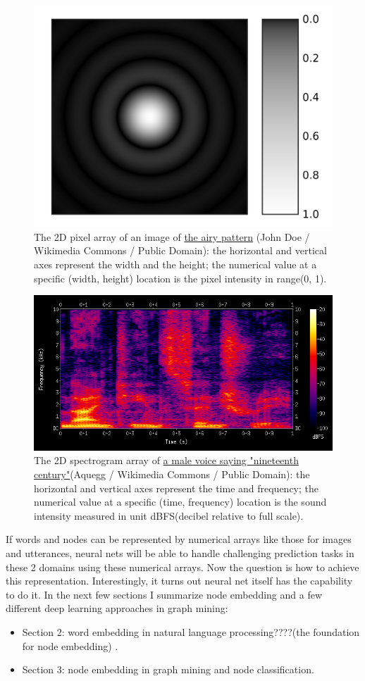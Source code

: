 \documentclass{article}
\begin{document}
\begin{figure}[h]
	\centering
	\includegraphics[width=0.5\linewidth]{Airy-pattern}
	\caption{The 2D pixel array of an image of  \href{https://commons.wikimedia.org/wiki/File:Airy-pattern.svg}{the airy pattern} (John Doe / Wikimedia Commons / Public Domain): the horizontal and vertical axes represent the width and the height; the numerical value at a specific (width, height) location is the pixel intensity in range(0, 1).}
	\label{fig:Airy-pattern}
\end{figure}

\begin{figure}[h]
	\centering
	\includegraphics[width=\linewidth]{Spectrogram-19thC}
	\caption{The 2D spectrogram array of \href{https://commons.wikimedia.org/wiki/File:Spectrogram-19thC.png}{a male voice saying "nineteenth century"}(Aquegg / Wikimedia Commons / Public Domain): the horizontal and vertical axes represent the time and frequency; the numerical value at a specific (time, frequency) location is the sound intensity measured in unit dBFS(decibel relative to full scale).}
	\label{fig:Spectrogram-19thC}
\end{figure}

If words and nodes can be represented by numerical arrays like those for images and utterances, neural nets will be able to handle challenging prediction tasks in these 2 domains using these numerical arrays. Now the question is how to achieve this representation. Interestingly, it turns out neural net itself has the capability to do it. In the next few sections I summarize node embedding and a few different deep learning approaches in graph mining:
\begin{itemize}
	\item Section 2: word embedding in natural language processing????(the foundation for node embedding) .
	\item Section 3: node embedding in graph mining and node classification.
\end{itemize}
\end{document}

